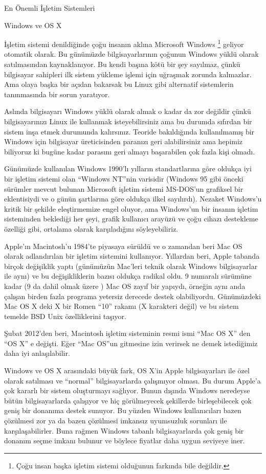 \begin{section}{En Önemli İşletim Sistemleri}
\begin{subsection}{Windows ve OS X}

İşletim sistemi denildiğinde çoğu insanın aklına Microsoft Windows
\footnote{Çoğu insan başka işletim sistemi olduğunun farkında bile değildir.} geliyor otomatik olarak. Bu günümüzde bilgisayarlarının çoğunun Windows yüklü olarak satılmasından kaynaklanıyor. Bu kendi başına kötü bir şey sayılmaz, çünkü bilgisayar sahipleri ilk sistem yükleme işlemi için uğraşmak zorunda kalmazlar. Ama olaya başka bir açıdan bakarsak bu Linux gibi alternatif sistemlerin tanınmasında bir sorun yaratıyor.

Aslında bilgisayarı Windows yüklü olarak almak o kadar da zor değildir çünkü bilgisayarınızı Linux ile kullanmak isteyebilirsiniz ama bu durumda sıfırdan bir sistem inşa etmek durumunda kalırsınız. Teoride bakıldığında kullanılmamış bir Windows için bilgisayar üreticisinden paranızı geri alabilirsiniz ama hepimiz biliyoruz ki bugüne kadar parasını geri almayı başarabilen çok fazla kişi olmadı.

Günümüzde kullanılan Windows 1990'lı yılların standartlarına göre oldukça iyi bir işletim sistemi olan “Windows NT”nin  varisidir (Windows 95 gibi önceki sürümler mevcut bulunan Microsoft işletim sistemi MS-DOS'un grafiksel bir eklentisiydi ve o günün şartlarına göre oldukça ilkel sayılırdı). Nezaket Windows'u kritik bir şekilde eleştirmemize engel oluyor, ama Windows'un bir insanın işletim sisteminden beklediği her şeyi, grafik kullanıcı arayüzü ve çoğu cihazı destekleme özelliği gibi, ortalama olarak karşıladığını söyleyebiliriz.

Apple’ın Macintosh'u 1984'te piyasaya sürüldü ve o zamandan beri Mac OS olarak adlandırılan bir işletim sistemini kullanıyor. Yıllardan beri, Apple tabanda birçok değişiklik yaptı (günümüzün Mac'leri teknik olarak Windows bilgisayarlar ile aynı) ve bu değişikliklerin bazısı oldukça radikal oldu. 9 numaralı sürümüne kadar (9 da dahil olmak üzere ) Mac OS zayıf bir yapıydı, örneğin aynı anda çalışan birden fazla programa yetersiz derecede destek olabiliyordu. Günümüzdeki Mac OS X deki X bir Romen “10” rakamı (X karakteri değil) ve bu sistem temelde BSD Unix özelliklerini taşıyor.

Şubat 2012'den beri, Macintosh işletim sisteminin resmi ismi “Mac OS X” den “OS X” e değişti. Eğer “Mac OS”un gitmesine izin verirsek ne demek istediğimiz daha iyi anlaşılabilir.

Windows ve OS X arasındaki büyük fark, OS X'in Apple bilgisayarları ile özel olarak satılması ve “normal” bilgisayarlarda çalışmıyor olması. Bu durum Apple'a çok kararlı bir sistem oluşturmayı sağlıyor. Bunun dışında Windows neredeyse bütün bilgisayarlarda çalışıyor ve hiç görülmeyecek şekillerde birleşebilecek çok geniş bir donanıma destek sunuyor. Bu yüzden Windows kullanıcıları bazen çözülmesi zor ya da bazen çözülmesi imkansız uyumsuzluk sorunları ile karşılaşabilirler.  Buna rağmen Windows tabanlı bilgisayarlarda çok geniş bir donanım seçme imkanı bulunur ve böylece fiyatlar daha uygun seviyeye iner.


\end{subsection}
\end{section}
